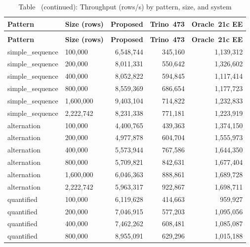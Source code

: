 {\scriptsize
\setlength{\tabcolsep}{3pt}
\begin{longtable}{>{\ttfamily}llrrr}
\caption{Throughput (rows/s) by pattern, dataset size, and system}
\label{tab:throughput} \\
\toprule
\textbf{Pattern} & \textbf{Size (rows)} & \textbf{Proposed} & \textbf{Trino~473} & \textbf{Oracle~21c EE} \\
\midrule
\endfirsthead
\caption*{Table~\thetable{} (continued): Throughput (rows/s) by pattern, size, and system} \\
\toprule
\textbf{Pattern} & \textbf{Size (rows)} & \textbf{Proposed} & \textbf{Trino~473} & \textbf{Oracle~21c EE} \\
\midrule
\endhead
\bottomrule
\endfoot
simple\_sequence & 100{,}000 & 6{,}548{,}744 & 345{,}160 & 1{,}139{,}312 \\
simple\_sequence & 200{,}000 & 8{,}011{,}331 & 550{,}642 & 1{,}326{,}602 \\
simple\_sequence & 400{,}000 & 8{,}052{,}822 & 594{,}845 & 1{,}117{,}414 \\
simple\_sequence & 800{,}000 & 8{,}559{,}369 & 686{,}654 & 1{,}177{,}723 \\
simple\_sequence & 1{,}600{,}000 & 9{,}403{,}104 & 714{,}822 & 1{,}232{,}833 \\
simple\_sequence & 2{,}222{,}742 & 8{,}231{,}338 & 771{,}181 & 1{,}223{,}919 \\
\midrule
alternation & 100{,}000 & 4{,}400{,}765 & 439{,}363 & 1{,}374{,}150 \\
alternation & 200{,}000 & 4{,}977{,}878 & 604{,}704 & 1{,}555{,}973 \\
alternation & 400{,}000 & 5{,}573{,}944 & 767{,}586 & 1{,}644{,}350 \\
alternation & 800{,}000 & 5{,}709{,}821 & 842{,}631 & 1{,}677{,}404 \\
alternation & 1{,}600{,}000 & 6{,}046{,}363 & 888{,}861 & 1{,}689{,}728 \\
alternation & 2{,}222{,}742 & 5{,}963{,}317 & 922{,}867 & 1{,}698{,}711 \\
\midrule
quantified & 100{,}000 & 6{,}119{,}628 & 414{,}663 & 959{,}927 \\
quantified & 200{,}000 & 7{,}046{,}915 & 577{,}203 & 1{,}095{,}056 \\
quantified & 400{,}000 & 7{,}462{,}262 & 608{,}481 & 1{,}085{,}087 \\
quantified & 800{,}000 & 8{,}955{,}091 & 629{,}296 & 1{,}015{,}188 \\

\end{longtable}}
